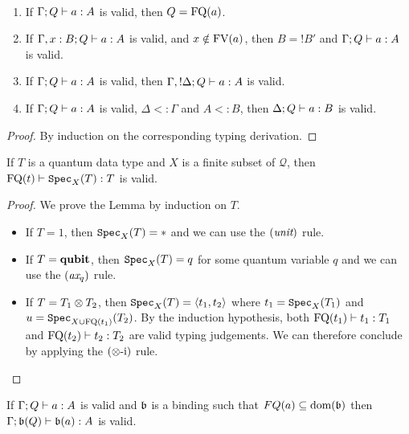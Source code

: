 \documentclass[twoside]{article}
\begin{document}
\begin{lemma}~
\label{prop_type_syst}
\begin{enumerate}
  \item If $\Gamma; Q \vdash a:A$ is valid, 
  then $Q=\mathop{\textrm{FQ}}\nolimits(a)$.\label{q_context}
  \item If $\Gamma,x:B;Q \vdash a:A$ is valid, 
  and $x\notin \mathop{\textrm{FV}}\nolimits(a)$, then $B={!}B'$ and 
  $\Gamma;Q \vdash a:A$ is valid.\label{unused_var}
  \item If $\Gamma; Q \vdash a:A$ is valid, 
  then $\Gamma, {!}\Delta ; Q \vdash a:A$ is valid.\label{weakening}
  \item If $\Gamma ; Q \vdash a:A$ is valid, $\Delta <: \Gamma$
  and $A<:B$, then $\Delta ; Q \vdash a:B$ is valid.\label{subtype}
\end{enumerate}
\end{lemma}

\begin{proof}
By induction on the corresponding typing derivation.
\end{proof}

\begin{lemma}
\label{specimen}
If $T$ is a quantum data type and $X$ is a finite subset of
$\mathcal{Q}$, then $\mathop{\textrm{FQ}}\nolimits(t)\vdash \texttt{Spec}_X(T):T$ is valid.
\end{lemma}

\begin{proof}
We prove the Lemma by induction on $T$.
  \begin{itemize}
    \item If $T=1$, then $\texttt{Spec}_X(T)=*$ and we can use the $(\textit{unit})$ rule.
    \item If $T=\textrm{\bf qubit}$, then $\texttt{Spec}_X(T)=q$ for some quantum variable $q$ and we can 
          use the $(\textit{ax}_q)$ rule.
    \item If $T=T_1\otimes T_2$, then $\texttt{Spec}_X(T)=\langle t_1,t_2\rangle$ where $t_1=\texttt{Spec}_X(T_1)$ 
          and $u=\texttt{Spec}_{X\cup \mathop{\textrm{FQ}}\nolimits(t_1)}(T_2)$. By the induction hypothesis, both 
          $\mathop{\textrm{FQ}}\nolimits(t_1)\vdash t_1:T_1$ and $\mathop{\textrm{FQ}}\nolimits(t_2)\vdash t_2:T_2$ are valid typing 
          judgements. We can therefore conclude by applying the $(\otimes\mbox{-i})$ rule.
  \end{itemize}
\end{proof}

\begin{lemma}
\label{binding_judgement}
If $\Gamma;Q \vdash a:A$ is valid and $\mathfrak{b}$ is a 
binding such that $FQ(a)\subseteq\mathop{\textrm{\rm dom}}\nolimits(\mathfrak{b})$ 
then $\Gamma;\mathfrak{b} (Q) \vdash \mathfrak{b}(a):A$ is valid.
\end{lemma}
\end{document}
